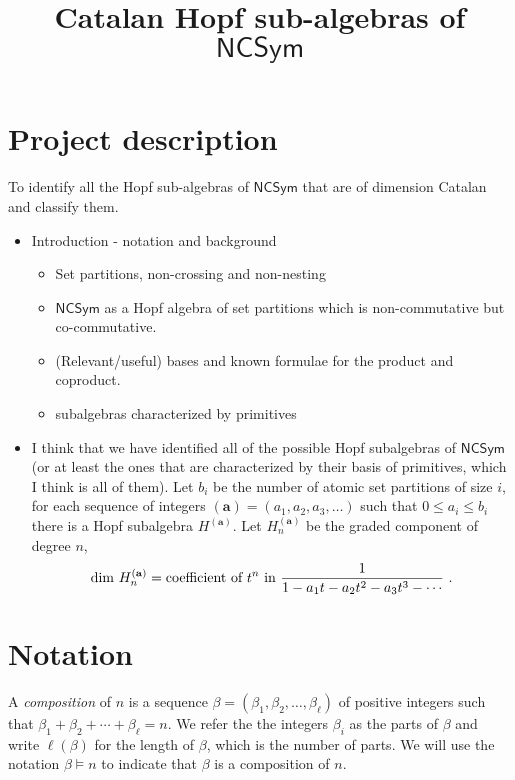 \documentclass[11pt]{amsart}
\title{Catalan Hopf sub-algebras of $\mathsf{NCSym}$}
\author{}
\newcommand{\defncolor}{\color{darkred}}
\newcommand{\defn}[1]{{\defncolor\emph{#1}}} %
\theoremstyle{definition}
\numberwithin{equation}{section}
\begin{document}
\maketitle

\section{Project description}

\noindent
To identify all the Hopf sub-algebras of $\mathsf{NCSym}$ that are of dimension Catalan and classify them.


\begin{itemize}
\item Introduction - notation and background
\cite{AT20, BBT14, BHRZ05, B08, BZ09, F12, LM11, NT05, RS06}
\cite{S09}
\begin{itemize}
\item Set partitions, non-crossing and non-nesting
\item $\mathsf{NCSym}$ as a Hopf algebra of set partitions which is non-commutative but co-commutative.
\item (Relevant/useful) bases and known formulae for the product and coproduct.
\item subalgebras characterized by primitives
\end{itemize}
\item I think that we have identified all of the possible Hopf subalgebras of $\mathsf{NCSym}$
(or at least the ones that are characterized by their basis of primitives, which I think is all of them).
Let $b_i$ be the number of atomic set partitions of size $i$, for each sequence of integers $(\mathbf{a}) = (a_1, a_2, a_3,\ldots)$ such that
$0 \leq a_i \leq b_i$ there is a Hopf subalgebra $H^{(\mathbf{a})}$.
Let $H^{(\mathbf{a})}_n$ be the graded component of degree $n$,
$$\mathrm{dim}~H^{(\mathbf{a})}_n = \hbox{coefficient of }t^n\hbox{ in }\frac{1}{1 - a_1 t - a_2 t^2 - a_3 t^3 - \cdots}~.$$
\end{itemize}

\section{Notation}

A \defn{composition} of $n$ is a sequence $\beta = (\beta_1, \beta_2, \ldots, \beta_\ell)$ of positive integers such that $\beta_{1} + \beta_{2} + \cdots + \beta_{\ell} = n$.  
We refer the the integers $\beta_{i}$ as the parts of $\beta$ and write $\ell(\beta)$ for the length of $\beta$, which is the number of parts.  
We will use the notation $\beta \vDash n$ to indicate that $\beta$ is a composition of $n$.
\end{document}
